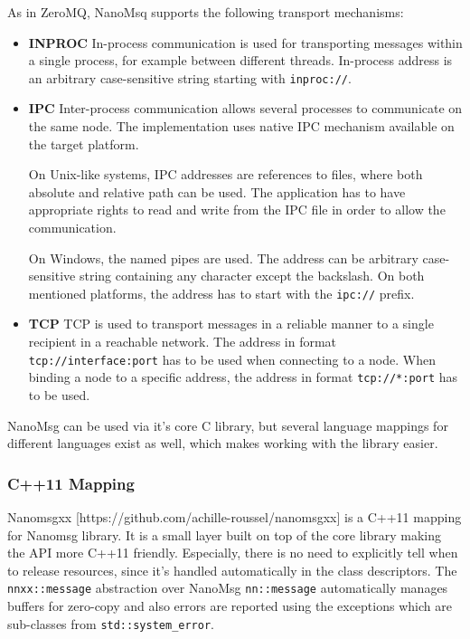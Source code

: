 As in ZeroMQ, NanoMsq supports the following transport mechanisms:
\begin{itemize}
	\item \textbf{INPROC} \newline
	In-process communication is used for transporting messages within a single process, for example between different threads. In-process address is an arbitrary case-sensitive string starting with \texttt{inproc://}.
	\item \textbf{IPC}  \newline 
	Inter-process communication allows several processes to communicate on the same node. The implementation uses native IPC mechanism available on the target platform. 
	
	On Unix-like systems, IPC addresses are references to files, where both absolute and relative path can be used. The application has to have appropriate rights to read and write from the IPC file in order to allow the communication.
	
	 On Windows, the named pipes are used. The address can be arbitrary case-sensitive string containing any character except the backslash. On both mentioned platforms, the address has to start with the \texttt{ipc://} prefix.
	\item \textbf{TCP} \newline
	TCP is used to transport messages in a reliable manner to a single recipient in a reachable network. The address in format \texttt{tcp://interface:port} has to be used when connecting to a node. When binding a node to a specific address, the address in format \texttt{tcp://*:port} has to be used.
\end{itemize}

NanoMsg can be used via it's core C library, but several language mappings for different languages exist as well, which makes working with the library easier.
\subsubsection{C++11 Mapping}
Nanomsgxx [https://github.com/achille-roussel/nanomsgxx] is a C++11 mapping for Nanomsg library. It is a small layer built on top of the core library making the API more C++11  friendly. Especially, there is no need to explicitly tell when to release resources, since it's handled automatically in the class descriptors. The \texttt{nnxx::message} abstraction over NanoMsg \texttt{nn::message} automatically manages buffers for zero-copy and also errors are reported using the exceptions which are sub-classes from \texttt{std::system\_error}.
